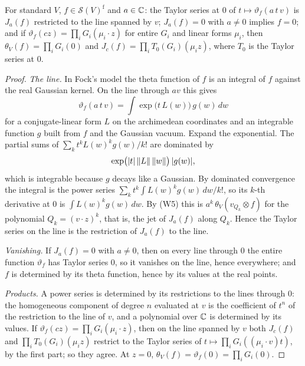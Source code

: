 \begin{lemma}\label{lem:jet-homogeneous}
For standard $V$, $f\in\mathcal S(V)^{\mathrm f}$ and $a\in\mathbb{C}$: the Taylor series at $0$ of
$t\mapsto\vartheta_f(a\,t\,v)$ is $J_a(f)$ restricted to the line spanned by $v$; $J_a(f)=0$ with
$a\ne0$ implies $f=0$; and if $\vartheta_f(cz)=\prod_iG_i(\mu_i\cdot z)$ for entire $G_i$ and linear
forms $\mu_i$, then $\theta_V(f)=\prod_iG_i(0)$ and $J_c(f)=\prod_iT_0(G_i)(\mu_iz)$, where $T_0$ is
the Taylor series at $0$.
\end{lemma}

\begin{proof}
\emph{The line.} In Fock's model the theta function of $f$ is an integral of $f$ against the real Gaussian kernel. On the line through $av$ this gives
\[
  \vartheta_f(a\,t\,v)=\int\exp\bigl(t\,L(w)\bigr)\,g(w)\,dw
\]
for a conjugate-linear form $L$ on the archimedean coordinates and an integrable function $g$ built from $f$ and the Gaussian vacuum. Expand the exponential. The partial sums of $\sum_kt^kL(w)^kg(w)/k!$ are dominated by
\[
  \exp\bigl(\lvert t\rvert\,\lVert L\rVert\,\lVert w\rVert\bigr)\,\lvert g(w)\rvert,
\]
which is integrable because $g$ decays like a Gaussian. By dominated convergence the integral is the power series $\sum_kt^k\int L(w)^kg(w)\,dw/k!$, so its $k$-th derivative at $0$ is $\int L(w)^kg(w)\,dw$. By (W5) this is $a^k\,\theta_V(v_{Q_k}\otimes f)$ for the polynomial $Q_k=(v\cdot z)^k$, that is, the jet of $J_a(f)$ along $Q_k$. Hence the Taylor series on the line is the restriction of $J_a(f)$ to the line.

\emph{Vanishing.} If $J_a(f)=0$ with $a\ne0$, then on every line through $0$ the entire function $\vartheta_f$ has Taylor series $0$, so it vanishes on the line, hence everywhere; and $f$ is determined by its theta function, hence by its values at the real points.

\emph{Products.} A power series is determined by its restrictions to the lines through $0$: the homogeneous component of degree $n$ evaluated at $v$ is the coefficient of $t^n$ of the restriction to the line of $v$, and a polynomial over $\mathbb{C}$ is determined by its values. If $\vartheta_f(cz)=\prod_iG_i(\mu_i\cdot z)$, then on the line spanned by $v$ both $J_c(f)$ and $\prod_iT_0(G_i)(\mu_iz)$ restrict to the Taylor series of $t\mapsto\prod_iG_i((\mu_i\cdot v)t)$, by the first part; so they agree. At $z=0$, $\theta_V(f)=\vartheta_f(0)=\prod_iG_i(0)$.
\end{proof}

